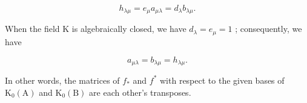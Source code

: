 \[
h _ {\lambda \mu} = e _ {\mu} a _ {\mu \lambda} = d _ {\lambda} b _ {\lambda \mu}.\tag{24}
\]

When the field K is algebraically closed, we have \(d_{\lambda} = e_{\mu} = 1\) ; consequently, we have

\[
a _ {\mu \lambda} = b _ {\lambda \mu} = h _ {\lambda \mu}.\tag{25}
\]

In other words, the matrices of \(f_{*}\) and \(f^{*}\) with respect to the given bases of \(\mathrm{K}_0(\mathrm{A})\) and \(\mathrm{K}_0(\mathrm{B})\) are each other's transposes.

